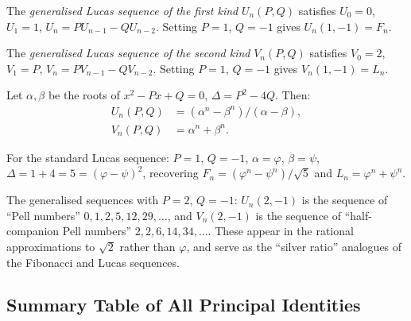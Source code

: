 The \emph{generalised Lucas sequence of the first kind}
\(U_n(P,Q)\) satisfies \(U_0 = 0\), \(U_1 = 1\),
\(U_n = PU_{n-1} - QU_{n-2}\).
Setting \(P = 1\), \(Q = -1\) gives \(U_n(1,-1) = F_n\).

The \emph{generalised Lucas sequence of the second kind}
\(V_n(P,Q)\) satisfies \(V_0 = 2\), \(V_1 = P\),
\(V_n = PV_{n-1} - QV_{n-2}\).
Setting \(P = 1\), \(Q = -1\) gives \(V_n(1,-1) = L_n\).

\begin{proposition}
\label{prop:gh-gen-lucas}
Let \(\alpha, \beta\) be the roots of \(x^2 - Px + Q = 0\),
\(\Delta = P^2 - 4Q\).  Then:
\begin{align*}
  U_n(P,Q) &= (\alpha^n - \beta^n)/(\alpha - \beta), \\
  V_n(P,Q) &= \alpha^n + \beta^n.
\end{align*}
\end{proposition}

For the standard Lucas sequence: \(P=1\), \(Q=-1\),
\(\alpha = \varphi\), \(\beta = \psi\),
\(\Delta = 1 + 4 = 5 = (\varphi-\psi)^2\),
recovering \(F_n = (\varphi^n-\psi^n)/\sqrt{5}\) and
\(L_n = \varphi^n + \psi^n\).

The generalised sequences with \(P = 2\), \(Q = -1\):
\(U_n(2,-1)\) is the sequence of ``Pell numbers''
\(0,1,2,5,12,29,\ldots\), and
\(V_n(2,-1)\) is the sequence of ``half-companion Pell numbers''
\(2,2,6,14,34,\ldots\).
These appear in the rational approximations to \(\sqrt{2}\)
rather than \(\varphi\), and serve as the ``silver ratio'' analogues
of the Fibonacci and Lucas sequences.

\subsection{Summary Table of All Principal Identities}
\label{subsec:gh-summary-table}

